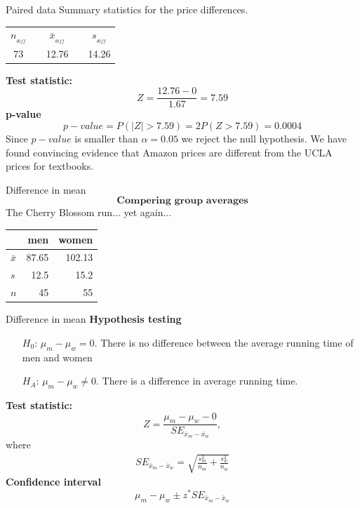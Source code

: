 \documentclass[12pt,a4paper]{beamer}
\begin{document}
\begin{frame}{Paired data}
	Summary statistics for the price differences.
	\begin{table}[hh]
	\centering
	\begin{tabular}{ccccc}
	\hline
	$n_{_{diff}}$	&\hspace{3mm}& $\bar{x}_{_{diff}}$	&\hspace{3mm}& $s_{_{diff}}$ \vspace{1mm}\\
	73			&& 12.76				&& 14.26 \\
	\hline
	\end{tabular}

	\end{table}
\textbf{Test statistic:}
\[Z =\frac{12.76 - 0}{1.67} = 7.59\]
\textbf{p-value}
\[p-value=P(|Z|>7.59)=2P(Z>7.59)=0.0004\]
Since $p-value$ is smaller than $\alpha=0.05$ we reject the null hypothesis.  We have found 
convincing evidence that Amazon prices are different from the UCLA prices for textbooks. 

\end{frame}
\begin{frame}{Difference in mean}
	\[\textbf{Compering group averages}\]
	The Cherry Blossom run... yet again...
	\begin{table}[h]
	\centering
	\begin{tabular}{l rr}
	\hline
		&	men	&	women \\
	\hline
	$\bar{x}$	& 87.65	& 102.13 \\
	$s$	&	12.5		& 15.2 \\
	$n$	&	45		& 55    \\
	\hline
	\end{tabular}
	
	\end{table}
\end{frame}
\begin{frame}{Difference in mean}
	\textbf{Hypothesis testing}
	\begin{itemize}
	\setlength{\itemsep}{0mm}
	\item[$H_0$:] $\mu_m-\mu_w=0$. There is no difference between the average running time of men and women
	\item[$H_A$:] $\mu_{m}-\mu_{w} \neq 0$. There is a difference in average running time.
	\end{itemize}
	\textbf{Test statistic:}
	\[Z=\frac{\mu_m-\mu_w-0}{SE_{\bar{x}_{m} - \bar{x}_{w}}},\]
	where 
	\begin{eqnarray}
	SE_{\bar{x}_{m} - \bar{x}_{w}} = \sqrt{\frac{s_m^2}{n_m} + \frac{s_w^2}{n_w}}
	\end{eqnarray}
		\textbf{Confidence interval}
		\[\mu_m-\mu_w\pm z^*SE_{\bar{x}_m-\bar{x}_w}\]
\end{frame}
\end{document}
